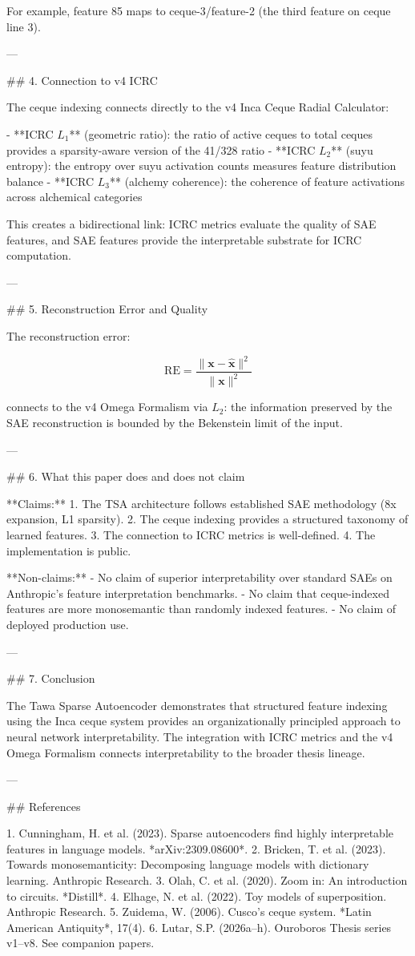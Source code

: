 For example, feature 85 maps to ceque-3/feature-2 (the third feature on ceque line 3).

---

## 4. Connection to v4 ICRC

The ceque indexing connects directly to the v4 Inca Ceque Radial Calculator:

- **ICRC \( L_1 \)** (geometric ratio): the ratio of active ceques to total ceques provides a sparsity-aware version of the 41/328 ratio
- **ICRC \( L_2 \)** (suyu entropy): the entropy over suyu activation counts measures feature distribution balance
- **ICRC \( L_3 \)** (alchemy coherence): the coherence of feature activations across alchemical categories

This creates a bidirectional link: ICRC metrics evaluate the quality of SAE features, and SAE features provide the interpretable substrate for ICRC computation.

---

## 5. Reconstruction Error and Quality

The reconstruction error:

\[
\text{RE} = \frac{\|\mathbf{x} - \hat{\mathbf{x}}\|^2}{\|\mathbf{x}\|^2}
\]

connects to the v4 Omega Formalism via \( L_2 \): the information preserved by the SAE reconstruction is bounded by the Bekenstein limit of the input.

---

## 6. What this paper does and does not claim

**Claims:**
1. The TSA architecture follows established SAE methodology (8x expansion, L1 sparsity).
2. The ceque indexing provides a structured taxonomy of learned features.
3. The connection to ICRC metrics is well-defined.
4. The implementation is public.

**Non-claims:**
- No claim of superior interpretability over standard SAEs on Anthropic's feature interpretation benchmarks.
- No claim that ceque-indexed features are more monosemantic than randomly indexed features.
- No claim of deployed production use.

---

## 7. Conclusion

The Tawa Sparse Autoencoder demonstrates that structured feature indexing using the Inca ceque system provides an organizationally principled approach to neural network interpretability. The integration with ICRC metrics and the v4 Omega Formalism connects interpretability to the broader thesis lineage.

---

## References

1. Cunningham, H. et al. (2023). Sparse autoencoders find highly interpretable features in language models. *arXiv:2309.08600*.
2. Bricken, T. et al. (2023). Towards monosemanticity: Decomposing language models with dictionary learning. Anthropic Research.
3. Olah, C. et al. (2020). Zoom in: An introduction to circuits. *Distill*.
4. Elhage, N. et al. (2022). Toy models of superposition. Anthropic Research.
5. Zuidema, W. (2006). Cusco's ceque system. *Latin American Antiquity*, 17(4).
6. Lutar, S.P. (2026a--h). Ouroboros Thesis series v1--v8. See companion papers.
